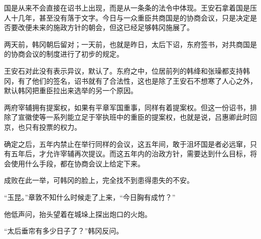 国是从来不会直接在诏书上出现，而是从一条条的法令中体现。王安石拿着国是压人十几年，甚至没有落于文字。今日与一众重臣共商国是的协商会议，只是决定是否要改便未来的施政方针的朝会，但这已经足够韩冈施展了。

两天前，韩冈朝后留对；一天前，也就是昨日，太后下诏，东府签书，对共商国是的协商会议的制度进行了初步的规定。

王安石对此没有表示异议，默认了。东府之中，位居前列的韩绛和张璪都支持韩冈，有了他们的签名，诏书就有了合法性，这也是除了王安石不想寒了人心之外，默认韩冈把重臣拉出来选举的另一个原因。

两府宰辅拥有提案权，如果有平章军国重事，同样有着提案权。但这一份诏书，排除了宣徽使等一系列能立足于宰执班中的重臣的提案权，也就是说，吕惠卿此时回京，也只有投票的权力。

确定之后，五年内禁止在举行同样的会议，这五年间，敢于沮坏国是者必远窜，只有五年后，才允许宰辅再次提议。而这五年内的治政方针，需要达到什么目标，将会使用什么手段，都在协商会议上给定下来。

成败在此一举，可韩冈的脸上，完全找不到患得患失的不安。

“玉昆。”章敦不知什么时候走了上来，“今日胸有成竹？”

他低声问，抬头望着在城垛上探出炮口的火炮。

“太后垂帘有多少日子了？”韩冈反问。
